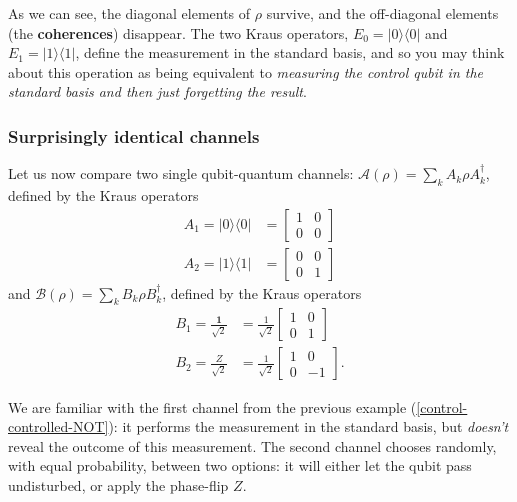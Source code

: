 \documentclass[fleqn]{article}
\begin{document}
As we can see, the diagonal elements of \(\rho\) survive, and the off-diagonal elements (the \textbf{coherences}) disappear.
The two Kraus operators, \(E_0=|0\rangle\langle 0|\) and \(E_1=|1\rangle\langle 1|\), define the measurement in the standard basis, and so you may think about this operation as being equivalent to \emph{measuring the control qubit in the standard basis and then just forgetting the result}.

\hypertarget{surprisingly-identical-channels}{%
\subsubsection{Surprisingly identical channels}\label{surprisingly-identical-channels}}

Let us now compare two single qubit-quantum channels: \(\mathcal{A}(\rho)=\sum_k A_k\rho A^\dagger_k\), defined by the Kraus operators
\[
  \begin{aligned}
    A_1 = |0\rangle\langle 0|
    &= \begin{bmatrix}1&0\\0&0\end{bmatrix}
  \\A_2 = |1\rangle\langle 1|
  &= \begin{bmatrix}0&0\\0&1\end{bmatrix}
  \end{aligned}
\]
and \(\mathcal{B}(\rho)=\sum_k B_k\rho B^\dagger_k\), defined by the Kraus operators
\[
  \begin{aligned}
    B_1 = \frac{\mathbf{1}}{\sqrt{2}}
    &= \frac{1}{\sqrt{2}}\begin{bmatrix}1&0\\0&1\end{bmatrix}
  \\B_2 = \frac{Z}{\sqrt{2}}
    &= \frac{1}{\sqrt{2}}\begin{bmatrix}1&0\\0&-1\end{bmatrix}.
  \end{aligned}
\]

We are familiar with the first channel from the previous example (\ref{control-controlled-NOT}): it performs the measurement in the standard basis, but \emph{doesn't} reveal the outcome of this measurement.
The second channel chooses randomly, with equal probability, between two options: it will either let the qubit pass undisturbed, or apply the phase-flip \(Z\).
\end{document}
